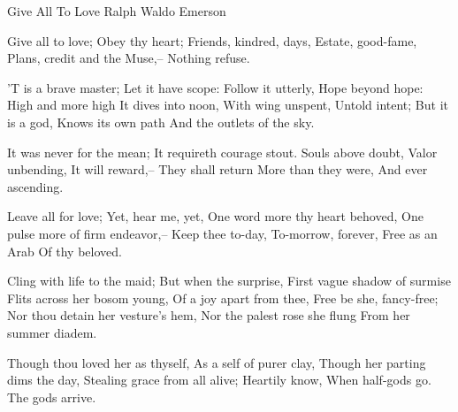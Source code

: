 Give All To Love
Ralph Waldo Emerson

Give all to love;
Obey thy heart;
Friends, kindred, days,
Estate, good-fame,
Plans, credit and the Muse,--
Nothing refuse.

'T is a brave master;
Let it have scope:
Follow it utterly,
Hope beyond hope:
High and more high
It dives into noon,
With wing unspent,
Untold intent;
But it is a god,
Knows its own path
And the outlets of the sky.

It was never for the mean;
It requireth courage stout.
Souls above doubt,
Valor unbending,
It will reward,--
They shall return
More than they were,
And ever ascending.

Leave all for love;
Yet, hear me, yet,
One word more thy heart behoved,
One pulse more of firm endeavor,--
Keep thee to-day,
To-morrow, forever,
Free as an Arab
Of thy beloved.

Cling with life to the maid;
But when the surprise,
First vague shadow of surmise
Flits across her bosom young,
Of a joy apart from thee,
Free be she, fancy-free;
Nor thou detain her vesture's hem,
Nor the palest rose she flung
From her summer diadem.

Though thou loved her as thyself,
As a self of purer clay,
Though her parting dims the day,
Stealing grace from all alive;
Heartily know,
When half-gods go.
The gods arrive.
